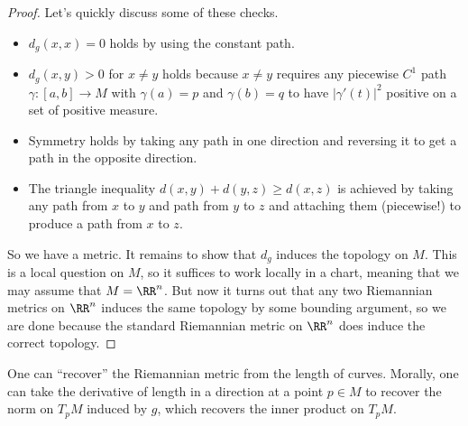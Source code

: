\documentclass[../notes.tex]{subfiles}
\begin{document}
\begin{proof}
	Let's quickly discuss some of these checks.
	\begin{itemize}
		\item $d_g(x,x)=0$ holds by using the constant path.
		\item $d_g(x,y)>0$ for $x\ne y$ holds because $x\ne y$ requires any piecewise $C^1$ path $\gamma\colon[a,b]\to M$ with $\gamma(a)=p$ and $\gamma(b)=q$ to have $\left|\gamma'(t)\right|^2$ positive on a set of positive measure.
		\item Symmetry holds by taking any path in one direction and reversing it to get a path in the opposite direction.
		\item The triangle inequality $d(x,y)+d(y,z)\ge d(x,z)$ is achieved by taking any path from $x$ to $y$ and path from $y$ to $z$ and attaching them (piecewise!) to produce a path from $x$ to $z$.
	\end{itemize}
	So we have a metric. It remains to show that $d_g$ induces the topology on $M$. This is a local question on $M$, so it suffices to work locally in a chart, meaning that we may assume that $M=\RR^n$. But now it turns out that any two Riemannian metrics on $\RR^n$ induces the same topology by some bounding argument, so we are done because the standard Riemannian metric on $\RR^n$ does induce the correct topology.
\end{proof}
\begin{remark}
	One can ``recover'' the Riemannian metric from the length of curves. Morally, one can take the derivative of length in a direction at a point $p\in M$ to recover the norm on $T_pM$ induced by $g$, which recovers the inner product on $T_pM$.
\end{remark}
\end{document}
